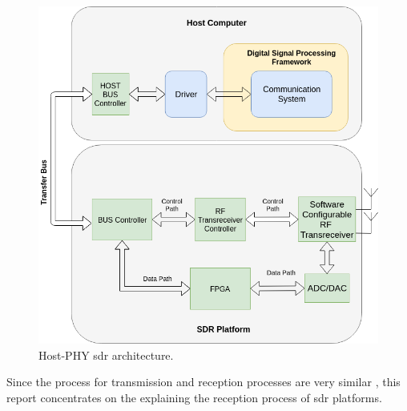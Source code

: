 \begin{figure}[h!]
\centering
\includegraphics[width=\textwidth]{Figure/Host_Phy.png}
\caption{Host-PHY \cite{nychis_enabling_nodate} \ac{sdr} architecture.}
\label{host_PHY}
\end{figure}


Since the process for transmission and reception processes are very similar , this report concentrates on the explaining the reception process of 
\ac{sdr} platforms.

